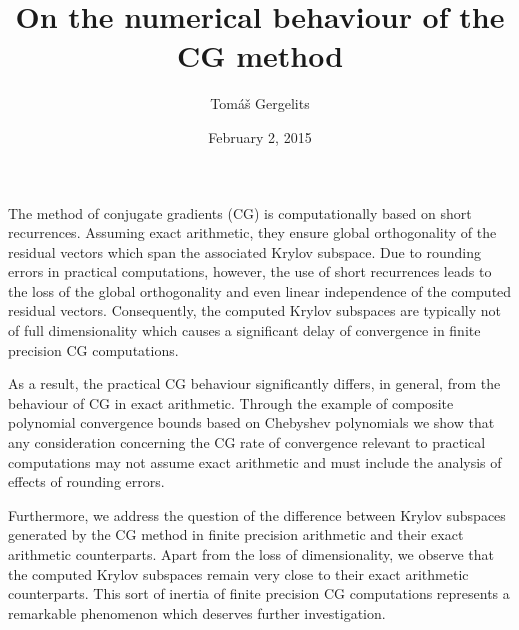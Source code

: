 \documentclass{article}
\title{On the numerical behaviour of the CG method}
\author{Tom{\'a}{\v s} Gergelits}
\affil{PhD student at Faculty of Mathematics and Physics, Charles University in Prague}
\date{February 2, 2015}
\begin{document}
\maketitle
\setcounter{page}{10}
The method of conjugate gradients (CG) is computationally based on short recurrences. Assuming exact arithmetic, they ensure global orthogonality of the residual vectors which span the associated Krylov subspace. Due to rounding errors in practical computations, however, the use of short recurrences leads to the loss of the global orthogonality and even linear independence of the computed residual vectors. Consequently, the computed Krylov subspaces are typically not of full dimensionality which causes a significant delay of convergence in finite precision CG computations.

As a result, the practical CG behaviour significantly differs, in general, from the behaviour of CG in exact arithmetic. Through the example of composite polynomial convergence bounds based on Chebyshev polynomials we show that any consideration concerning the CG rate of convergence relevant to practical computations may not assume exact arithmetic and must include the analysis of effects of rounding errors.

Furthermore, we address the question of the difference between Krylov subspaces generated by the CG method in finite precision arithmetic and their exact arithmetic counterparts. Apart from the loss of dimensionality, we observe that  the computed Krylov subspaces remain very close to their exact arithmetic counterparts. This sort of inertia of finite precision CG computations represents a remarkable phenomenon which deserves further investigation.
\end{document}
